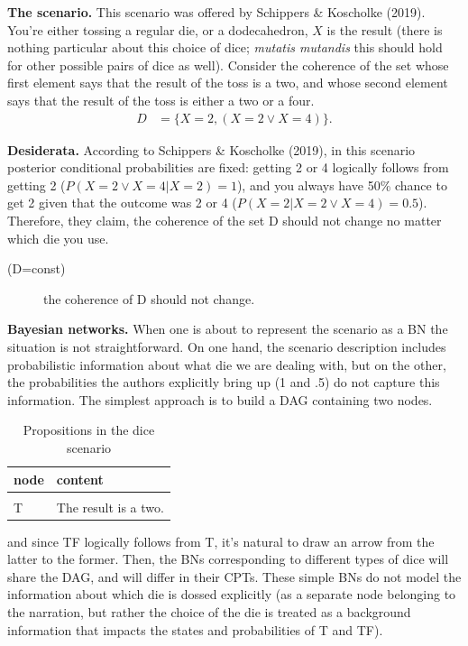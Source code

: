 \documentclass[
  10pt,
]{scrartcl}
\newcommand{\s}[1]{\textsf{#1}}
\begin{document}
\textbf{The scenario.} This scenario was offered by Schippers \& Koscholke (2019). You're either tossing a regular die, or a dodecahedron, \(X\) is the result (there is nothing particular about this choice of dice; \emph{mutatis mutandis} this should hold for other possible pairs of dice as well). Consider the coherence of the set whose first element says that the result of the toss is a two, and whose second element says that the result of the toss is either a two or a four.
\begin{align*} D &= \{X=2, (X=2\vee X=4)\}.\end{align*}

\noindent \textbf{Desiderata.} According to Schippers \& Koscholke (2019), in this scenario posterior conditional probabilities are fixed: getting 2 or 4 logically follows from getting 2 (\(P(X=2\vee X=4|X=2)=1\)), and you always have 50\% chance to get 2 given that the outcome was 2 or 4 (\(P(X=2|X=2\vee X=4)=0.5\)). Therefore, they claim, the coherence of the set \s{D} should not change no matter which die you use.

\vspace{2mm}\begin{description}
    \item[(\s{D=const})] the coherence of \s{D} should not change.
\end{description}\vspace{2mm}

\textbf{Bayesian networks.} When one is about to represent the scenario as a BN the situation is not straightforward. On one hand, the scenario description includes probabilistic information about what die we are dealing with, but on the other, the probabilities the authors explicitly bring up (1 and .5) do not capture this information. The simplest approach is to build a DAG containing two nodes.

\begin{table}[H]

\caption{\label{tab:penguinsDesiderata}Propositions in the dice scenario}
\centering
\begin{tabular}[t]{ll}
\toprule
node & content\\
\midrule
\cellcolor{gray!6}{TF} & \cellcolor{gray!6}{The result is a two or a four.}\\
T & The result is a two.\\
\bottomrule
\end{tabular}
\end{table}

\noindent and since \s{TF} logically follows from \s{T}, it's natural to draw an arrow from the latter to the former. Then, the BNs corresponding to different types of dice will share the DAG, and will differ in their CPTs. These simple BNs do not model the information about which die is dossed explicitly (as a separate node belonging to the narration, but rather the choice of the die is treated as a background information that impacts the states and probabilities of T and TF).
\end{document}
